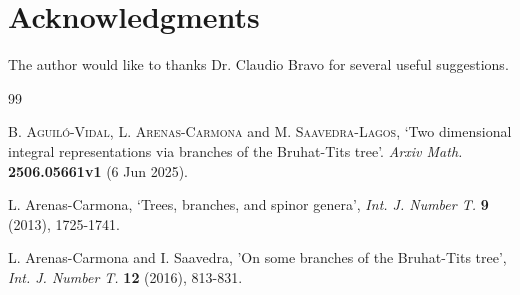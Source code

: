 \documentclass{amsart}
\theoremstyle{definition}
\begin{document}
\section{Acknowledgments}

The author would like to thanks Dr. Claudio Bravo for several useful suggestions.

\begin{thebibliography}{99}%

{\scshape B. Aguil\'o-Vidal}, 
{\scshape L. Arenas-Carmona} and
{\scshape M. Saavedra-Lagos}, `Two dimensional 
integral representations via branches of the
Bruhat-Tits tree'.
{\em   Arxiv Math.} \textbf{2506.05661v1} (6 Jun 2025).





{\sc L. Arenas-Carmona}, `Trees, branches, and
spinor genera',  {\em Int. J. Number T.} \textbf{9} (2013), 1725-1741. 



{\sc L. Arenas-Carmona} and {\sc I. Saavedra}, 
'On some branches of the Bruhat-Tits tree', 
 {\em Int. J. Number T.} \textbf{12} (2016), 
 813-831.



\end{thebibliography}
\end{document}
